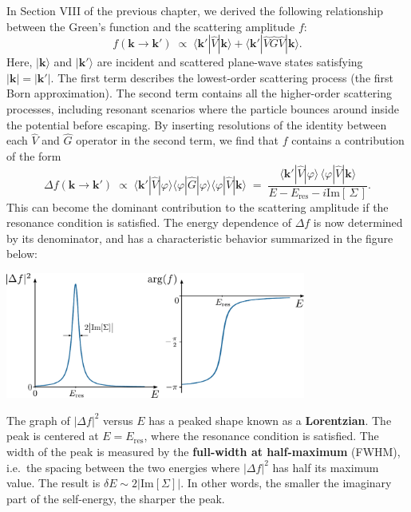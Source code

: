 \documentclass[pra,12pt]{revtex4}
\begin{document}
In Section VIII of the previous chapter, we derived the following
relationship between the Green's function and the scattering amplitude
$f$:
$$f(\mathbf{k}\rightarrow\mathbf{k}') \;\propto\; \langle \mathbf{k}'|\hat{V}|\mathbf{k}\rangle + \langle \mathbf{k}'|\hat{V}\hat{G}\hat{V}|\mathbf{k}\rangle.$$
Here, $|\mathbf{k}\rangle$ and $|\mathbf{k}'\rangle$ are incident and
scattered plane-wave states satisfying $|\mathbf{k}|=|\mathbf{k}'|$.
The first term describes the lowest-order scattering process (the
first Born approximation).  The second term contains all the
higher-order scattering processes, including resonant scenarios where
the particle bounces around inside the potential before escaping.
By inserting resolutions of the identity between each $\hat{V}$ and
$\hat{G}$ operator in the second term, we find that $f$ contains a
contribution of the form
$$\Delta f(\mathbf{k}\rightarrow\mathbf{k}') \;\propto\; \langle \mathbf{k}'|\hat{V}|\varphi\rangle\langle\varphi|\hat{G}|\varphi\rangle\langle\varphi|\hat{V}|\mathbf{k}\rangle \;=\; \frac{\langle \mathbf{k}'|\hat{V}|\varphi\rangle \, \langle\varphi|\hat{V}|\mathbf{k}\rangle}{\displaystyle E - E_{\mathrm{res}} - i \mathrm{Im}[\,\Sigma\,]}.$$
This can become the dominant contribution to the scattering amplitude
if the resonance condition is satisfied.  The energy dependence of
$\Delta f$ is now determined by its denominator, and has a
characteristic behavior summarized in the figure below:

\begin{center}
  \includegraphics[width=0.74\textwidth]{resonance}  
\end{center}

The graph of $|\Delta f|^2$ versus $E$ has a peaked shape known as a
\textbf{Lorentzian}.  The peak is centered at $E = E_{\mathrm{res}}$,
where the resonance condition is satisfied.  The width of the peak is
measured by the \textbf{full-width at half-maximum} (FWHM), i.e.~the
spacing between the two energies where $|\Delta f|^2$ has half its
maximum value.  The result is $\delta E \sim 2|\mathrm{Im}[\Sigma]|$.
In other words, the smaller the imaginary part of the self-energy, the
sharper the peak.
\end{document}

